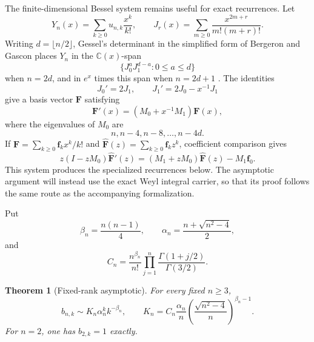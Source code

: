 \documentclass[11pt]{article}
\newtheorem{theorem}{Theorem}[section]
\theoremstyle{definition}
\begin{document}
The finite-dimensional Bessel system remains useful for exact recurrences.
Let
\[
 Y_n(x)=\sum_{k\ge0}u_{n,k}\frac{x^k}{k!},
 \qquad
 J_r(x)=\sum_{m\ge0}\frac{x^{2m+r}}{m!(m+r)!}.
\]
Writing $d=\lfloor n/2\rfloor$, Gessel's determinant in the simplified form
of Bergeron and Gascon places $Y_n$ in the $\mathbb C(x)$-span
\[
 \{J_0^aJ_1^{d-a}:0\le a\le d\}
\]
when $n=2d$, and in $e^x$ times this span when $n=2d+1$
\cite{BergeronGascon2000}.  The identities
\[
 J_0'=2J_1,
 \qquad
 J_1'=2J_0-x^{-1}J_1
\]
give a basis vector $\mathbf F$ satisfying
\begin{equation}\label{eq:bessel-system}
 \mathbf F'(x)=(M_0+x^{-1}M_1)\mathbf F(x),
\end{equation}
where the eigenvalues of $M_0$ are
\begin{equation}\label{eq:bessel-scales}
 n,n-4,n-8,\ldots,n-4d.
\end{equation}
If $\mathbf F=\sum_{k\ge0}\mathbf f_kx^k/k!$ and
$\widehat{\mathbf F}(z)=\sum_{k\ge0}\mathbf f_kz^k$, coefficient comparison
gives
\begin{equation}\label{eq:ordinary-bessel-system}
 z(I-zM_0)\widehat{\mathbf F}'(z)
 =(M_1+zM_0)\widehat{\mathbf F}(z)-M_1\mathbf f_0.
\end{equation}
This system produces the specialized recurrences below.  The asymptotic
argument will instead use the exact Weyl integral carrier, so that its proof
follows the same route as the accompanying formalization.

Put
\[
 \beta_n=\frac{n(n-1)}4,
 \qquad
 \alpha_n=\frac{n+\sqrt{n^2-4}}2,
\]
and
\begin{equation}\label{eq:regev-constant}
 C_n=\frac{n^{\beta_n}}{n!}
 \prod_{j=1}^n\frac{\Gamma(1+j/2)}{\Gamma(3/2)}.
\end{equation}

\begin{theorem}[Fixed-rank asymptotic]\label{thm:fixed-rank-asymptotic}
For every fixed $n\ge3$,
\begin{equation}\label{eq:fixed-rank-asymptotic}
 b_{n,k}\sim K_n\alpha_n^k k^{-\beta_n},
 \qquad
 K_n=C_n\frac{\alpha_n}{n}
 \left(\frac{\sqrt{n^2-4}}{n}\right)^{\beta_n-1}.
\end{equation}
For $n=2$, one has $b_{2,k}=1$ exactly.
\end{theorem}
\end{document}
